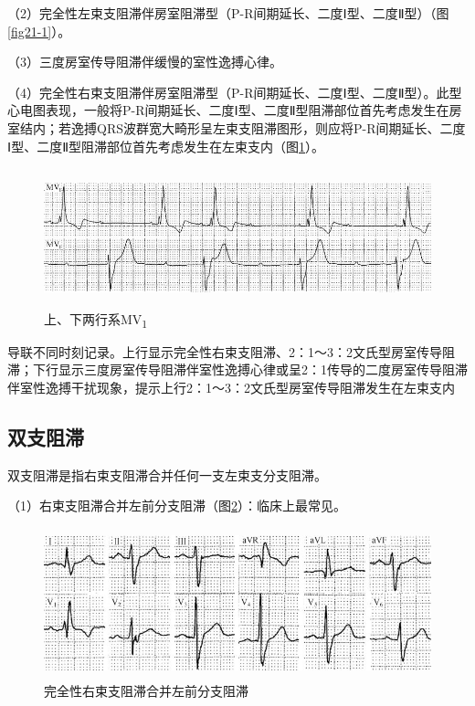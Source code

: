 （2）完全性左束支阻滞伴房室阻滞型（P-R间期延长、二度Ⅰ型、二度Ⅱ型）（图\ref{fig21-1}）。

（3）三度房室传导阻滞伴缓慢的室性逸搏心律。

（4）完全性右束支阻滞伴房室阻滞型（P-R间期延长、二度Ⅰ型、二度Ⅱ型）。此型心电图表现，一般将P-R间期延长、二度Ⅰ型、二度Ⅱ型阻滞部位首先考虑发生在房室结内；若逸搏QRS波群宽大畸形呈左束支阻滞图形，则应将P-R间期延长、二度Ⅰ型、二度Ⅱ型阻滞部位首先考虑发生在左束支内（图\ref{fig21-12}）。

\begin{figure}[!htbp]
 \centering
 \includegraphics[width=5.58333in,height=1.57292in]{./images/Image00360.jpg}
 \captionsetup{justification=centering}
 \caption{上、下两行系MV\textsubscript{1}}
 \label{fig21-12}
  \end{figure} 
导联不同时刻记录。上行显示完全性右束支阻滞、2：1～3：2文氏型房室传导阻滞；下行显示三度房室传导阻滞伴室性逸搏心律或呈2：1传导的二度房室传导阻滞伴室性逸搏干扰现象，提示上行2：1～3：2文氏型房室传导阻滞发生在左束支内

\protect\hypertarget{text00028.htmlux5cux23subid351}{}{}

\subsection{双支阻滞}

双支阻滞是指右束支阻滞合并任何一支左束支分支阻滞。

（1）右束支阻滞合并左前分支阻滞（图\ref{fig21-13}）：临床上最常见。

\begin{figure}[!htbp]
 \centering
 \includegraphics[width=4.92708in,height=1.70833in]{./images/Image00361.jpg}
 \captionsetup{justification=centering}
 \caption{完全性右束支阻滞合并左前分支阻滞}
 \label{fig21-13}
  \end{figure} 

